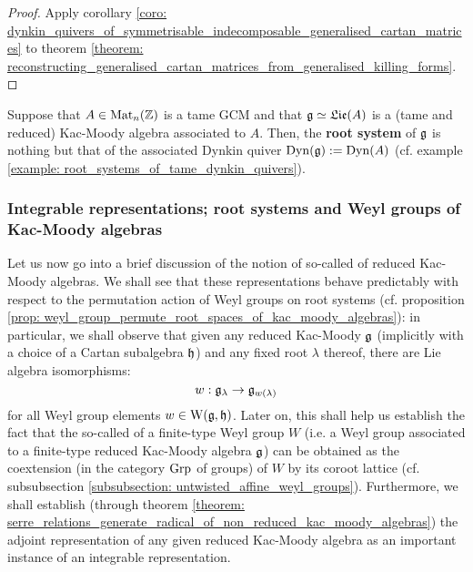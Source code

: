                 \begin{proof}
                    Apply corollary \ref{coro: dynkin_quivers_of_symmetrisable_indecomposable_generalised_cartan_matrices} to theorem \ref{theorem: reconstructing_generalised_cartan_matrices_from_generalised_killing_forms}.
                \end{proof}
                
            \begin{definition} \label{def: kac_moody_root_systems}
                Suppose that $A \in \mathrm{Mat}_n(\mathbb{Z})$ is a tame GCM and that $\mathfrak{g} \simeq \mathfrak{Lie}(A)$ is a (tame and reduced) Kac-Moody algebra associated to $A$. Then, the \textbf{root system} of $\mathfrak{g}$ is nothing but that of the associated Dynkin quiver $\mathrm{Dyn}(\mathfrak{g}) := \mathrm{Dyn}(A)$ (cf. example \ref{example: root_systems_of_tame_dynkin_quivers}). 
            \end{definition}
        
        \subsubsection{Integrable representations; root systems and Weyl groups of Kac-Moody algebras}
            Let us now go into a brief discussion of the notion of so-called  of reduced Kac-Moody algebras. We shall see that these representations behave predictably with respect to the permutation action of Weyl groups on root systems (cf. proposition \ref{prop: weyl_group_permute_root_spaces_of_kac_moody_algebras}): in particular, we shall observe that given any reduced Kac-Moody $\mathfrak{g}$ (implicitly with a choice of a Cartan subalgebra $\mathfrak{h}$) and any fixed root $\lambda$ thereof, there are Lie algebra isomorphisms:
                $$w: \mathfrak{g}_{\lambda} \to \mathfrak{g}_{w(\lambda)}$$
            for all Weyl group elements $w \in \mathrm{W}(\mathfrak{g}, \mathfrak{h})$. Later on, this shall help us establish the fact that the so-called  of a finite-type Weyl group $W$ (i.e. a Weyl group associated to a finite-type reduced Kac-Moody algebra $\mathfrak{g}$) can be obtained as the coextension (in the category $\mathrm{Grp}$ of groups) of $W$ by its coroot lattice (cf. subsubsection \ref{subsubsection: untwisted_affine_weyl_groups}). Furthermore, we shall establish (through theorem \ref{theorem: serre_relations_generate_radical_of_non_reduced_kac_moody_algebras}) the adjoint representation of any given reduced Kac-Moody algebra as an important instance of an integrable representation. 
        
